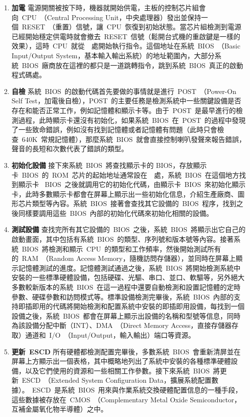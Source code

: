 \begin{enumerate}
\item{\textbf{加電}} 電源開關被按下時，機器就開始供電，主板的控制芯片組會向~CPU~（Central Processing Unit，中央處理器）發出並保持一個~RESET~（重置）信號，讓~CPU~恢復到初始狀態。當芯片組檢測到電源已經開始穩定供電時就會撤去~RESET~信號（鬆開台式機的重啟鍵是一樣的效果），這時~CPU~就從~~處開始執行指令。這個地址在系統~BIOS~（Basic Input/Output System，基本輸入輸出系統）的地址範圍內，大部分系統~BIOS~廠商放在這裡的都只是一道跳轉指令，跳到系統~BIOS~真正的啟動程式碼處。

\item{\textbf{自檢}} 系統~BIOS~的啟動代碼首先要做的事情就是進行~POST~（Power-On Self Test，加電後自檢），POST~的主要任務是檢測系統中一些關鍵設備是否存在和能否正常工作，例如記憶體和顯示卡等。由于~POST~是最早進行的檢測過程，此時顯示卡還沒有初始化，如果系統~BIOS~在~POST~的過程中發現了一些致命錯誤，例如沒有找到記憶體或者記憶體有問題（此時只會檢查~640K~常規記憶體），那麼系統~BIOS~就會直接控制喇叭發聲來報告錯誤，聲音的長短和次數代表了錯誤的類型。

\item{\textbf{初始化設備}} 接下來系統~BIOS~將查找顯示卡的 BIOS，存放顯示卡~BIOS~的~ROM~芯片的起始地址通常設在~~處，系統~BIOS~在這個地方找到顯示卡 ~BIOS~之後就調用它的初始化代碼，由顯示卡~BIOS~來初始化顯示卡，此時多數顯示卡都會在屏幕上顯示出一些初始化信息，介紹生產廠商、圖形芯片類型等內容。系統~BIOS~接著會查找其它設備的~BIOS~程序，找到之後同樣要調用這些~BIOS~內部的初始化代碼來初始化相關的設備。

\item{\textbf{測試設備}} 查找完所有其它設備的~BIOS~之後，系統~BIOS~將顯示出它自己的啟動畫面，其中包括有系統~BIOS~的類型、序列號和版本號等內容。接著系統~BIOS~將檢測和顯示~CPU~的類型和工作頻率，然後開始測試所有的~RAM~（Random Access Memory，隨機訪問存儲器），並同時在屏幕上顯示記憶體測試的進度。記憶體測試通過之後，系統~BIOS~將開始檢測系統中安裝的一些標準硬體設備，包括硬碟、光驅、串口、並口、軟驅等，另外絕大多數較新版本的系統~BIOS~在這一過程中還要自動檢測和設置記憶體的定時參數、硬碟參數和訪問模式等。標準設備檢測完畢後，系統~BIOS~內部的支持即插即用的代碼將開始檢測和配置系統中安裝的即插即用設備，每找到一個設備之後，系統~BIOS~都會在屏幕上顯示出設備的名稱和型號等信息，同時為該設備分配中斷（INT）、DMA~（Direct Memory Access，直接存儲器存取）通道和~I/O~（Input/Output，輸入輸出）端口等資源。

\item{\textbf{更新~ESCD}} 所有硬體都檢測配置完畢後，多數系統~BIOS~會重新清屏並在屏幕上方顯示出一個表格，其中概略地列出了系統中安裝的各種標準硬體設備，以及它們使用的資源和一些相關工作參數。接下來系統~BIOS~將更新~ESCD~（Extended System Configuration Data，擴展系統配置數據）。~ESCD~是系統~BIOS~用來與作業系統交換硬體配置信息的一種手段，這些數據被存放在~CMOS~（Complementary Metal Oxide Semiconductor，互補金屬氧化物半導體）之中。


\end{enumerate}
